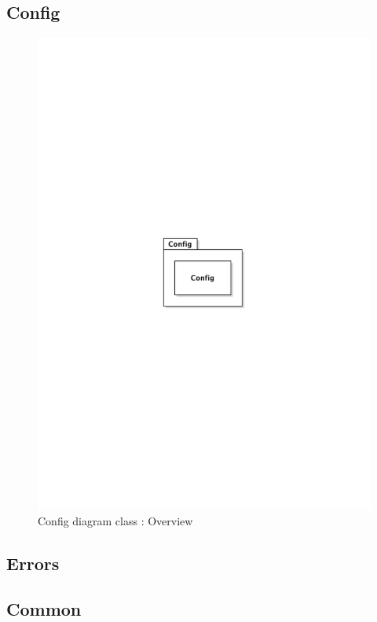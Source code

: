 	\subsection{Config}
		\begin{figure}[ht]
			\begin{center}
				\includegraphics[width=\textwidth,  trim=2cm 12cm 2cm 12cm]{UML_figure/DC/core/config/DC_Config.pdf}
				\caption{Config diagram class : Overview}
			\end{center}
		\end{figure}
	\subsection{Errors}
	\subsection{Common}

